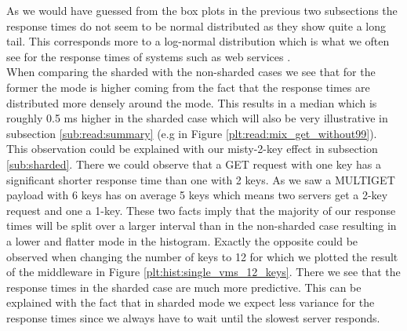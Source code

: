 \documentclass[11pt,a4paper]{article}
\begin{document}
As we would have guessed from the box plots in the previous two subsections the response times do not seem to be normal distributed as they show quite a long tail. This corresponds more to a log-normal distribution which is what we often see for the response times of systems such as web services \cite{resp_time_dist}. \\
When comparing the sharded with the non-sharded cases we see that for the former the mode is higher coming from the fact that the response times are distributed more densely around the mode. This results in a median which is roughly 0.5 ms higher in the sharded case which will also be very illustrative in subsection \ref{sub:read:summary} (e.g in Figure \ref{plt:read:mix_get_without99}). This observation could be explained with our misty-2-key effect in subsection \ref{sub:sharded}. There we could observe that a GET request with one key has a significant shorter response time than one with 2 keys. As we saw a MULTIGET payload with 6 keys has on average 5 keys which means two servers get a 2-key request and one a 1-key. These two facts imply that the majority of our response times will be split over a larger interval than in the non-sharded case resulting in a lower and flatter mode in the histogram. Exactly the opposite could be observed when changing the number of keys to 12 for which we plotted the result of the middleware in Figure \ref{plt:hist:single_vms_12_keys}. There we see that the response times in the sharded case are much more predictive. This can be explained with the fact that in sharded mode we expect less variance for the response times since we always have to wait until the slowest server responds. 
\end{document}
